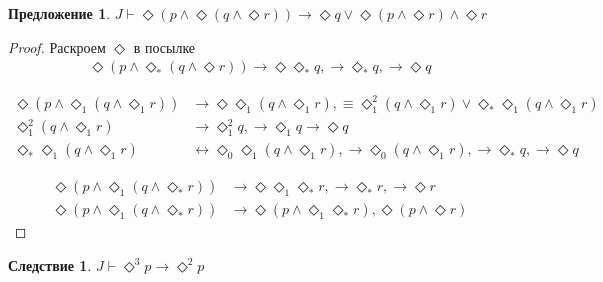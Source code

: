 \documentclass[12pt,a4paper,oneside]{article} \usepackage[left=2cm, right=2cm, top=1.3cm,
\newtheorem{proposition}{Предложение} \newtheorem{lemma}{Лемма} \newtheorem*{corollary}{Следствие}
\begin{document}
  \begin{proposition}
    $J \vdash  \Diamond (p \wedge  \Diamond (q \wedge  \Diamond  r)) \rightarrow  \Diamond q \vee 
    \Diamond (p \wedge  \Diamond r) \wedge  \Diamond r$ 
  \end{proposition}
  \begin{proof}
    Раскроем $\Diamond $ в посылке
    \begin{align*}
      \Diamond (p \wedge  \Diamond_* (q \wedge  \Diamond  r)) \rightarrow  \Diamond \Diamond_* q,
      \rightarrow  \Diamond_* q, \rightarrow  \Diamond q
    \end{align*}

    \begin{align*}
      \Diamond (p \wedge  \Diamond_1 (q \wedge  \Diamond_1 r)) &\rightarrow  \Diamond \Diamond_1 (q
      \wedge  \Diamond_1 r), \equiv \Diamond_1 ^2(q \wedge  \Diamond_1 r) \vee 
      \Diamond_* \Diamond_1 (q \wedge  \Diamond_1 r)\\
      \Diamond_1 ^2(q \wedge  \Diamond_1 r) &\rightarrow  \Diamond_1 ^2 q, \rightarrow  \Diamond_1 q
      \rightarrow  \Diamond q\\
      \Diamond_* \Diamond_1 (q \wedge  \Diamond_1 r) &\leftrightarrow  \Diamond_0 \Diamond_1 (q
      \wedge  \Diamond_1 r), \rightarrow  \Diamond_0 (q \wedge  \Diamond_1 r), \rightarrow 
      \Diamond_* q, \rightarrow  \Diamond q
    \end{align*}

    \begin{align*}
      \Diamond (p \wedge  \Diamond_1 (q \wedge  \Diamond_* r)) &\rightarrow 
      \Diamond \Diamond_1 \Diamond_* r, \rightarrow  \Diamond_* r, \rightarrow  \Diamond r\\
      \Diamond (p \wedge  \Diamond_1 (q \wedge  \Diamond_* r)) &\rightarrow  \Diamond (p \wedge 
      \Diamond_1 \Diamond_* r), \Diamond (p \wedge  \Diamond r)
    \end{align*}
  \end{proof}
  \begin{corollary}
    $J \vdash  \Diamond ^3p \rightarrow  \Diamond ^2p$ 
  \end{corollary}
\end{document}
